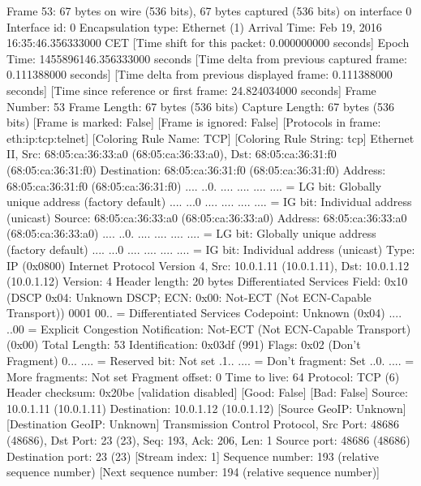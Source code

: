 Frame 53: 67 bytes on wire (536 bits), 67 bytes captured (536 bits) on interface 0
    Interface id: 0
    Encapsulation type: Ethernet (1)
    Arrival Time: Feb 19, 2016 16:35:46.356333000 CET
    [Time shift for this packet: 0.000000000 seconds]
    Epoch Time: 1455896146.356333000 seconds
    [Time delta from previous captured frame: 0.111388000 seconds]
    [Time delta from previous displayed frame: 0.111388000 seconds]
    [Time since reference or first frame: 24.824034000 seconds]
    Frame Number: 53
    Frame Length: 67 bytes (536 bits)
    Capture Length: 67 bytes (536 bits)
    [Frame is marked: False]
    [Frame is ignored: False]
    [Protocols in frame: eth:ip:tcp:telnet]
    [Coloring Rule Name: TCP]
    [Coloring Rule String: tcp]
Ethernet II, Src: 68:05:ca:36:33:a0 (68:05:ca:36:33:a0), Dst: 68:05:ca:36:31:f0 (68:05:ca:36:31:f0)
    Destination: 68:05:ca:36:31:f0 (68:05:ca:36:31:f0)
        Address: 68:05:ca:36:31:f0 (68:05:ca:36:31:f0)
        .... ..0. .... .... .... .... = LG bit: Globally unique address (factory default)
        .... ...0 .... .... .... .... = IG bit: Individual address (unicast)
    Source: 68:05:ca:36:33:a0 (68:05:ca:36:33:a0)
        Address: 68:05:ca:36:33:a0 (68:05:ca:36:33:a0)
        .... ..0. .... .... .... .... = LG bit: Globally unique address (factory default)
        .... ...0 .... .... .... .... = IG bit: Individual address (unicast)
    Type: IP (0x0800)
Internet Protocol Version 4, Src: 10.0.1.11 (10.0.1.11), Dst: 10.0.1.12 (10.0.1.12)
    Version: 4
    Header length: 20 bytes
    Differentiated Services Field: 0x10 (DSCP 0x04: Unknown DSCP; ECN: 0x00: Not-ECT (Not ECN-Capable Transport))
        0001 00.. = Differentiated Services Codepoint: Unknown (0x04)
        .... ..00 = Explicit Congestion Notification: Not-ECT (Not ECN-Capable Transport) (0x00)
    Total Length: 53
    Identification: 0x03df (991)
    Flags: 0x02 (Don't Fragment)
        0... .... = Reserved bit: Not set
        .1.. .... = Don't fragment: Set
        ..0. .... = More fragments: Not set
    Fragment offset: 0
    Time to live: 64
    Protocol: TCP (6)
    Header checksum: 0x20be [validation disabled]
        [Good: False]
        [Bad: False]
    Source: 10.0.1.11 (10.0.1.11)
    Destination: 10.0.1.12 (10.0.1.12)
    [Source GeoIP: Unknown]
    [Destination GeoIP: Unknown]
Transmission Control Protocol, Src Port: 48686 (48686), Dst Port: 23 (23), Seq: 193, Ack: 206, Len: 1
    Source port: 48686 (48686)
    Destination port: 23 (23)
    [Stream index: 1]
    Sequence number: 193    (relative sequence number)
    [Next sequence number: 194    (relative sequence number)]
